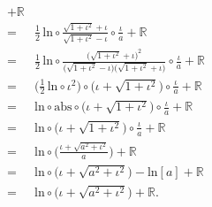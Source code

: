 \begin{example}
\begin{align*}
        + \mathbb{R}                                                            \\
        = {} & \frac{1}{2}\,\mathrm{ln} \circ \frac{\sqrt{1 + \iota^2} + \iota}
        {\sqrt{1 + \iota^2} - \iota} \circ \frac{\iota}{a} + \mathbb{R}         \\
        = {} & \frac{1}{2}\,\mathrm{ln} \circ \frac{\big( \sqrt{1 + \iota^2}
            + \iota \big)^2}
        {\big( \sqrt{1 + \iota^2} - \iota \big)
            \big( \sqrt{1 + \iota^2} + \iota \big)}
        \circ \frac{\iota}{a} + \mathbb{R}                                      \\
        = {} & \bigg( \frac{1}{2}\,\mathrm{ln} \circ \iota^2 \bigg) \circ
        \big( \iota + \sqrt{1 + \iota^2} \big) \circ \frac{\iota}{a}
        + \mathbb{R}                                                            \\
        = {} & \mathrm{ln} \circ \mathrm{abs} \circ
        \big( \iota + \sqrt{1 + \iota^2} \big) \circ \frac{\iota}{a}
        + \mathbb{R}                                                            \\
        = {} & \mathrm{ln} \circ \big( \iota + \sqrt{1 + \iota^2} \big)
        \circ \frac{\iota}{a} + \mathbb{R}                                      \\
        = {} & \mathrm{ln} \circ \Bigg( \frac{\iota + \sqrt{a^2 + \iota^2}}{a}
        \Bigg) + \mathbb{R}                                                     \\
        = {} & \mathrm{ln} \circ \big( \iota + \sqrt{a^2 + \iota^2}
        \big) - \mathrm{ln} [a] + \mathbb{R}                                    \\
        = {} & \mathrm{ln} \circ \big( \iota + \sqrt{a^2 + \iota^2}
        \big) + \mathbb{R}.
    \end{align*}
\end{example}

